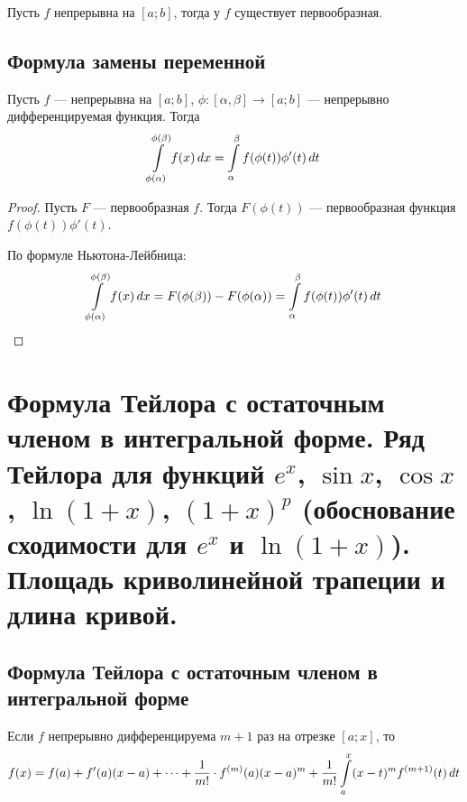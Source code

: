 \documentclass[a4paper]{article}
\theoremstyle{named}
\renewcommand{\int}{\intop}
\begin{document}
        \begin{consequence*}
            Пусть $f$ непрерывна на $[a; b]$, тогда у $f$ существует первообразная.
        \end{consequence*}

        \subsection{Формула замены переменной}

        \begin{consequence*}
            Пусть $f$ --- непрерывна на $[a; b]$, $\phi: [\alpha, \beta] \to [a; b]$ --- непрерывно дифференцируемая функция. Тогда
            \begin{equation*}
                \int_{\phi(\alpha)}^{\phi(\beta)} f(x) \dd x = \int_{\alpha}^{\beta} f(\phi(t)) \phi'(t) \dd t
            \end{equation*}
        \end{consequence*}

        \begin{proof}
            Пусть $F$ --- первообразная $f$. Тогда $F(\phi(t))$ --- первообразная функция $f(\phi(t)) \phi'(t)$. 

            По формуле Ньютона-Лейбница:
            \begin{equation*}
                \int_{\phi(\alpha)}^{\phi(\beta)} f(x) \dd x = F(\phi(\beta)) - F(\phi(\alpha)) = \int_{\alpha}^{\beta} f(\phi(t)) \phi'(t) \dd t
            \end{equation*}
        \end{proof}

    \section{Формула Тейлора с остаточным членом в интегральной форме. Ряд Тейлора для функций $e^x$, $\sin x$, $\cos x$, $\ln(1 + x)$, $(1 + x)^p$ (обоснование сходимости для $e^x$ и $\ln(1 + x)$). Площадь криволинейной трапеции и длина кривой.}

    	\subsection{Формула Тейлора с остаточным членом в интегральной форме}

    	\begin{theorem*}
    		Если $f$ непрерывно дифференцируема $m + 1$ раз на отрезке $[a; x]$, то
    		\begin{equation*}
    			f(x) = f(a) + f'(a)(x - a) + \dots + \dfrac{1}{m!} \cdot f^{(m)}(a) (x-  a)^m + \dfrac{1}{m!} \int_a^x (x - t)^m f^{(m + 1)}(t) \dd t
    		\end{equation*}
    	\end{theorem*}
\end{document}
